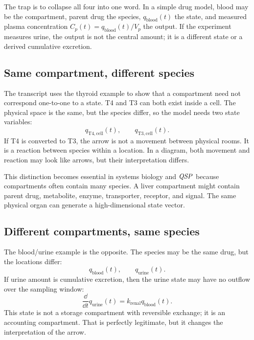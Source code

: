 \documentclass[a4paper]{article}
\newcommand{\ddt}{\frac{\dd}{\dd t}}
\newcommand{\QSP}{\ensuremath{\pksym{QSP}}}
\begin{document}
The trap is to collapse all four into one word. In a simple drug model, blood may be the compartment, parent drug the species, \(q_{\mathrm{blood}}(t)\) the state, and measured plasma concentration \(C_p(t)=q_{\mathrm{blood}}(t)/V_p\) the output. If the experiment measures urine, the output is not the central amount; it is a different state or a derived cumulative excretion.

\subsection{Same compartment, different species}

The transcript uses the thyroid example to show that a compartment need not correspond one-to-one to a state. T4 and T3 can both exist inside a cell. The physical space is the same, but the species differ, so the model needs two state variables:
\[
  q_{\mathrm{T4,cell}}(t),\qquad q_{\mathrm{T3,cell}}(t).
\]
If T4 is converted to T3, the arrow is not a movement between physical rooms. It is a reaction between species within a location. In a diagram, both movement and reaction may look like arrows, but their interpretation differs.

\begin{center}
\end{center}

This distinction becomes essential in systems biology and \QSP{} because compartments often contain many species. A liver compartment might contain parent drug, metabolite, enzyme, transporter, receptor, and signal. The same physical organ can generate a high-dimensional state vector.

\subsection{Different compartments, same species}

The blood/urine example is the opposite. The species may be the same drug, but the locations differ:
\[
  q_{\mathrm{blood}}(t),\qquad q_{\mathrm{urine}}(t).
\]
If urine amount is cumulative excretion, then the urine state may have no outflow over the sampling window:
\[
  \ddt q_{\mathrm{urine}}(t)=k_{\mathrm{renal}}q_{\mathrm{blood}}(t).
\]
This state is not a storage compartment with reversible exchange; it is an accounting compartment. That is perfectly legitimate, but it changes the interpretation of the arrow.
\end{document}
